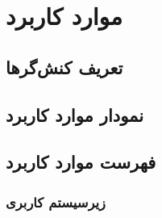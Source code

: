 
\chapter{موارد کاربرد}


\section{تعریف کنش‌گر‌ها}


\section{نمودار موارد کاربرد}


\newpage
\section{فهرست موارد کاربرد}


\subsection{زیرسیستم کاربری}

